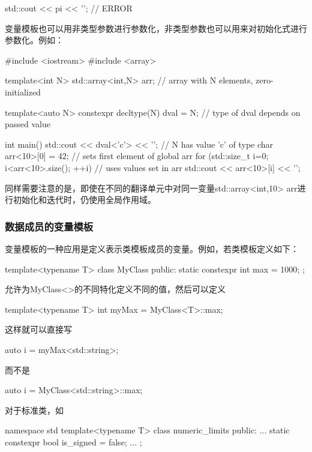 \begin{cpp}
std::cout << pi << '\n'; // ERROR
\end{cpp}

变量模板也可以用非类型参数进行参数化，非类型参数也可以用来对初始化式进行参数化。例如：

\begin{cpp}
#include <iostream>
#include <array>

template<int N>
std::array<int,N> arr{}; // array with N elements, zero-initialized

template<auto N>
	constexpr decltype(N) dval = N; // type of dval depends on passed value

int main()
{
	std::cout << dval<'c'> << '\n'; // N has value 'c' of type char
	arr<10>[0] = 42; // sets first element of global arr
	for (std::size_t i=0; i<arr<10>.size(); ++i) { // uses values set in arr
		std::cout << arr<10>[i] << '\n';
	}
}
\end{cpp}

同样需要注意的是，即使在不同的翻译单元中对同一变量std::array<int,10> arr进行初始化和迭代时，仍使用全局作用域。

\subsubsection{数据成员的变量模板}

变量模板的一种应用是定义表示类模板成员的变量。例如，若类模板定义如下：

\begin{cpp}
template<typename T>
class MyClass {
	public:
	static constexpr int max = 1000;
};
\end{cpp}

允许为MyClass<>的不同特化定义不同的值，然后可以定义

\begin{cpp}
template<typename T>
int myMax = MyClass<T>::max;
\end{cpp}

这样就可以直接写

\begin{cpp}
auto i = myMax<std::string>;
\end{cpp}

而不是

\begin{cpp}
auto i = MyClass<std::string>::max;
\end{cpp}

对于标准类，如

\begin{cpp}
namespace std {
	template<typename T> class numeric_limits {
		public:
		...
		static constexpr bool is_signed = false;
		...
	};
}
\end{cpp}

